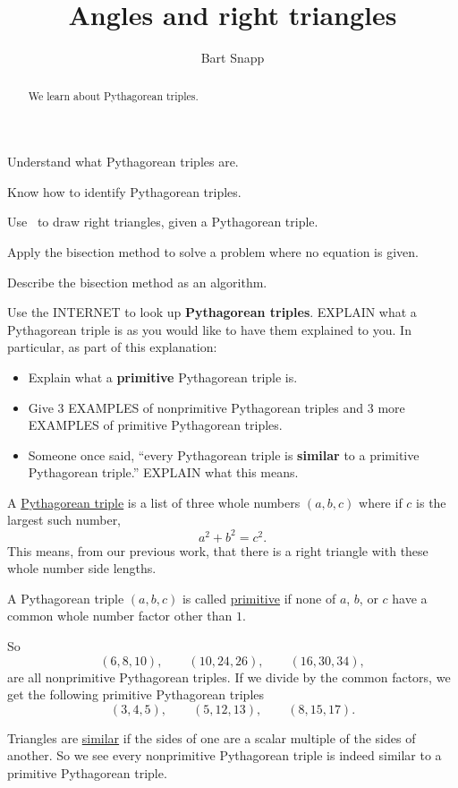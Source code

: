\documentclass[noauthor,nooutcomes,12pt]{ximera}
\title{Angles and right triangles}
\author{Bart Snapp}
\begin{document}
\begin{abstract}
  We learn about Pythagorean triples.
\end{abstract}
\maketitle

\begin{listOutcomes}
\item{Understand what Pythagorean triples are.}
\item{Know how to identify Pythagorean triples.}
\item{Use \snap\ to draw right triangles, given a Pythagorean triple.}
\item{Apply the bisection method to solve a problem where no equation is given.}
\item{Describe the bisection method as an algorithm.}
\end{listOutcomes}
\mynewpage

\begin{question}
  Use the INTERNET to look up \textbf{Pythagorean triples}. EXPLAIN
  what a Pythagorean triple is as you would like to have them
  explained to you. In particular, as part of this explanation:
  \begin{itemize}
    \item Explain what a \textbf{primitive} Pythagorean triple is.
    \item Give $3$ EXAMPLES of nonprimitive Pythagorean triples and
      $3$ more EXAMPLES of primitive Pythagorean triples.
    \item Someone once said, ``every Pythagorean triple is
      \textbf{similar} to a primitive Pythagorean triple.'' EXPLAIN
      what this means.
  \end{itemize}
  \begin{freeResponse}
    A \underline{Pythagorean triple} is a list of three whole numbers
    $(a,b,c)$ where if $c$ is the largest such number,
    \[
    a^2 + b^2 = c^2.
    \]
    This means, from our previous work, that there is a right triangle
    with these whole number side lengths.

    
    A Pythagorean triple $(a,b,c)$ is called \underline{primitive} if
    none of $a$, $b$, or $c$ have a common whole number factor other
    than $1$.
    
    So
    \[
    (6,8,10), \qquad (10,24,26), \qquad (16,30,34), 
    \]
    are all nonprimitive Pythagorean triples. If we divide by the
    common factors, we get the following primitive Pythagorean
    triples
    \[
    (3,4,5), \qquad (5,12,13), \qquad (8,15,17).
    \]

    Triangles are \underline{similar} if the sides of one are a scalar
    multiple of the sides of another. So we see every nonprimitive
    Pythagorean triple is indeed similar to a primitive Pythagorean
    triple.
  \end{freeResponse}
\end{question}
\mynewpage
\end{document}
